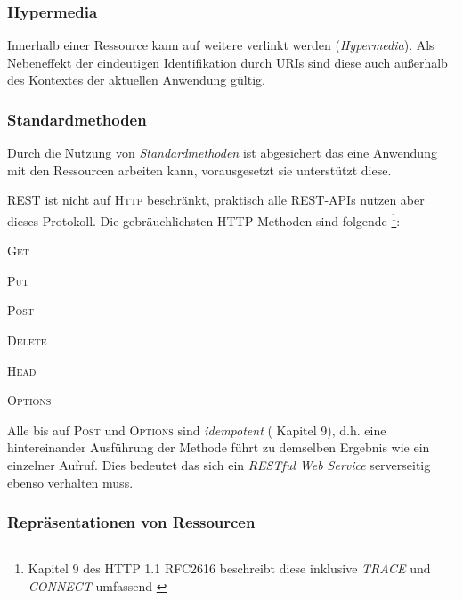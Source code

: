 \subsubsection{Hypermedia}
\label{sec:hypermedia}

Innerhalb einer Ressource kann auf weitere verlinkt werden (\emph{Hypermedia}). Als Nebeneffekt der eindeutigen Identifikation durch \glspl{URI} sind diese auch außerhalb des Kontextes der aktuellen Anwendung gültig. 


\subsubsection{Standardmethoden}
\label{sec:standardmethods}

Durch die Nutzung von \emph{Standardmethoden} ist abgesichert das eine Anwendung mit den Ressourcen arbeiten kann, vorausgesetzt sie unterstützt diese. 

\gls{REST} ist nicht auf \textsc{Http} beschränkt, praktisch alle REST-APIs nutzen aber dieses Protokoll. Die gebräuchlichsten HTTP-Methoden sind folgende \footnote{Kapitel 9 des HTTP 1.1 RFC2616 beschreibt diese inklusive \emph{TRACE} und \emph{CONNECT} umfassend \cite{rfc2616}}:
\begin{compactitem}
    \item \textsc{Get}
    \item \textsc{Put}
    \item \textsc{Post}
    \item \textsc{Delete}
    \item \textsc{Head}
    \item \textsc{Options}
\end{compactitem}

Alle bis auf \textsc{Post} und \textsc{Options} sind \emph{idempotent} (\cite{rfc2616} Kapitel 9), d.h. eine hintereinander Ausführung der Methode führt zu demselben Ergebnis wie ein einzelner Aufruf. Dies bedeutet das sich ein \emph{RESTful Web Service} serverseitig ebenso verhalten muss.

\subsubsection{Repräsentationen von Ressourcen}
\label{sec:representationofresources}

